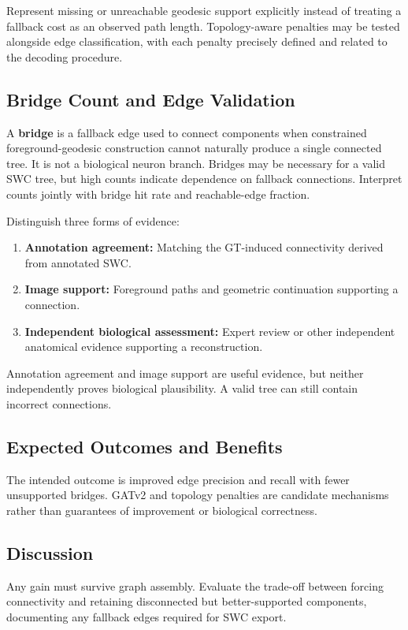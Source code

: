 \documentclass[11pt,a4paper]{article}
\begin{document}
Represent missing or unreachable geodesic support explicitly instead of treating a fallback cost as an observed path length. Topology-aware penalties may be tested alongside edge classification, with each penalty precisely defined and related to the decoding procedure.

\subsection{Bridge Count and Edge Validation}
A \textbf{bridge} is a fallback edge used to connect components when constrained foreground-geodesic construction cannot naturally produce a single connected tree. It is not a biological neuron branch. Bridges may be necessary for a valid SWC tree, but high counts indicate dependence on fallback connections. Interpret counts jointly with bridge hit rate and reachable-edge fraction.

Distinguish three forms of evidence:
\begin{enumerate}
    \item \textbf{Annotation agreement:} Matching the GT-induced connectivity derived from annotated SWC.
    \item \textbf{Image support:} Foreground paths and geometric continuation supporting a connection.
    \item \textbf{Independent biological assessment:} Expert review or other independent anatomical evidence supporting a reconstruction.
\end{enumerate}
Annotation agreement and image support are useful evidence, but neither independently proves biological plausibility. A valid tree can still contain incorrect connections.

\subsection{Expected Outcomes and Benefits}
The intended outcome is improved edge precision and recall with fewer unsupported bridges. GATv2 and topology penalties are candidate mechanisms rather than guarantees of improvement or biological correctness.

\subsection{Discussion}
Any gain must survive graph assembly. Evaluate the trade-off between forcing connectivity and retaining disconnected but better-supported components, documenting any fallback edges required for SWC export.
\end{document}

